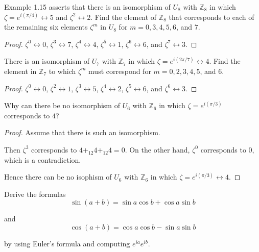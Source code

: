 \begin{exercise}
    Example 1.15 asserts that there is an isomorphism of $U_{8}$ with $\mathbb{Z}_{8}$ in which $\zeta = e^{i(\pi/4)}\leftrightarrow 5$ and $\zeta^{2}\leftrightarrow 2$. Find the element of $\mathbb{Z}_{8}$ that corresponds to each of the remaining six elements $\zeta^{m}$ in $U_{8}$ for $m = 0, 3, 4, 5, 6$, and $7$.
\end{exercise}

\begin{proof}
    $\zeta^{0} \leftrightarrow 0$, $\zeta^{3} \leftrightarrow 7$, $\zeta^{4} \leftrightarrow 4$, $\zeta^{5}\leftrightarrow 1$, $\zeta^{6}\leftrightarrow 6$, and $\zeta^{7}\leftrightarrow 3$.
\end{proof}

\begin{exercise}
    There is an isomorphism of $U_{7}$ with $\mathbb{Z}_{7}$ in which $\zeta = e^{i(2\pi/7)}\leftrightarrow 4$. Find the element in $\mathbb{Z}_{7}$ to which $\zeta^{m}$ must correspond for $m = 0, 2, 3, 4, 5$, and $6$.
\end{exercise}

\begin{proof}
    $\zeta^{0} \leftrightarrow 0$, $\zeta^{2} \leftrightarrow 1$, $\zeta^{3} \leftrightarrow 5$, $\zeta^{4} \leftrightarrow 2$, $\zeta^{5} \leftrightarrow 6$, and $\zeta^{6} \leftrightarrow 3$.
\end{proof}

\begin{exercise}
    Why can there be no isomorphism of $U_{6}$ with $\mathbb{Z}_{6}$ in which $\zeta = e^{i(\pi/3)}$ corresponds to $4$?
\end{exercise}

\begin{proof}
    Assume that there is such an isomorphism.

    Then $\zeta^{3}$ corresponds to $4 {+}_{12} 4 {+}_{12} 4 = 0$. On the other hand, $\zeta^{0}$ corresponds to $0$, which is a contradiction.

    Hence there can be no isophism of $U_{6}$ with $\mathbb{Z}_{6}$ in which $\zeta = e^{i(\pi/3)}\leftrightarrow 4$.
\end{proof}

\begin{exercise}
    Derive the formulas
    \[
        \sin(a + b) = \sin a\cos b + \cos a\sin b
    \]

    and
    \[
        \cos(a + b) = \cos a\cos b - \sin a\sin b
    \]

    by using Euler's formula and computing $e^{ia}e^{ib}$.
\end{exercise}

